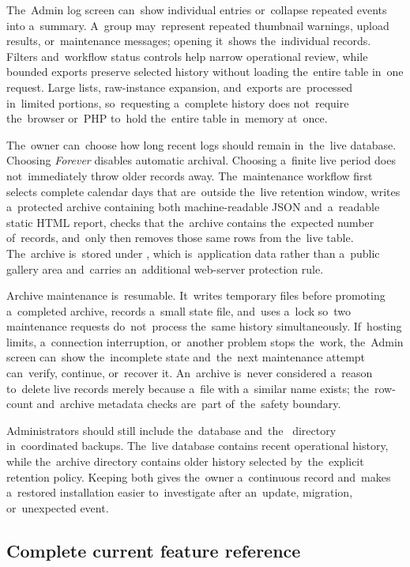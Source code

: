 \documentclass[11pt,a4paper]{article}
\newcommand{\filepath}[1]{\path{#1}}
\begin{document}
The~Admin log screen can~show individual entries or~collapse repeated events
into a~summary. A~group may~represent repeated thumbnail warnings, upload
results, or~maintenance messages; opening it~shows the~individual records.
Filters and~workflow status controls help narrow operational review, while
bounded exports preserve selected history without loading the~entire table
in~one request. Large lists, raw-instance expansion, and~exports are~processed
in~limited portions, so~requesting a~complete history does not~require
the~browser or~PHP to~hold the~entire table in~memory at~once.

The~owner can~choose how long recent logs should remain in~the~live database.
Choosing \emph{Forever} disables automatic archival. Choosing a~finite live
period does not~immediately throw older records away. The~maintenance workflow
first selects complete calendar days that are~outside the~live retention window,
writes a~protected archive containing both machine-readable JSON and~a~readable
static HTML report, checks that the~archive contains the~expected number
of~records, and~only then removes those same rows from the~live table.
The~archive is~stored under \filepath{data/admin-log-archives/}, which
is~application data rather than a~public gallery area and~carries an~additional
web-server protection rule.

Archive maintenance is~resumable. It~writes temporary files before promoting
a~completed archive, records a~small state file, and~uses a~lock so~two
maintenance requests do~not~process the~same history simultaneously. If~hosting
limits, a~connection interruption, or~another problem stops the~work, the~Admin
screen can~show the~incomplete state and~the~next maintenance attempt
can~verify, continue, or~recover it. An~archive is~never considered a~reason
to~delete live records merely because a~file with a~similar name exists;
the~row-count and~archive metadata checks are~part of~the~safety boundary.

Administrators should still include the~database
and~the~\filepath{data/admin-log-archives/} directory in~coordinated backups.
The~live database contains recent operational history, while the~archive
directory contains older history selected by~the~explicit retention policy.
Keeping both gives the~owner a~continuous record and~makes a~restored
installation easier to~investigate after an~update, migration, or~unexpected
event.

\subsection{Complete current feature reference}
\label{sec:complete-feature-reference}
\end{document}
